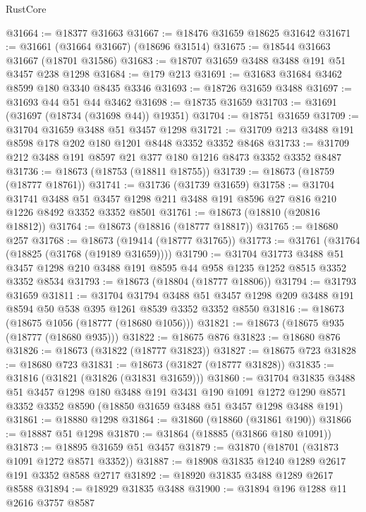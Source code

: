 \begin{lexlean}{RustCore}
\begin{coremodule}
@31664 := @18377 @31663
@31667 := @18476 @31659 @18625 @31642
@31671 := @31661 (@31664 @31667) (@18696 @31514)
@31675 := @18544 @31663 @31667 (@18701 @31586)
@31683 := @18707 @31659 @3488 @3488 @191 @51 @3457 @238 @1298
@31684 := @179 @213
@31691 := @31683 @31684 @3462 @8599 @180 @3340 @8435 @3346
@31693 := @18726 @31659 @3488
@31697 := @31693 @44 @51 @44 @3462
@31698 := @18735 @31659
@31703 := @31691 (@31697 (@18734 (@31698 @44)) @19351)
@31704 := @18751 @31659
@31709 := @31704 @31659 @3488 @51 @3457 @1298
@31721 := @31709 @213 @3488 @191 @8598 @178 @202 @180 @1201 @8448 @3352 @3352 @8468
@31733 := @31709 @212 @3488 @191 @8597 @21 @377 @180 @1216 @8473 @3352 @3352 @8487
@31736 := @18673 (@18753 (@18811 @18755))
@31739 := @18673 (@18759 (@18777 @18761))
@31741 := @31736 (@31739 @31659)
@31758 := @31704
    @31741
    @3488
    @51
    @3457
    @1298
    @211
    @3488
    @191
    @8596
    @27
    @816
    @210
    @1226
    @8492
    @3352
    @3352
    @8501
@31761 := @18673 (@18810 (@20816 @18812))
@31764 := @18673 (@18816 (@18777 @18817))
@31765 := @18680 @257
@31768 := @18673 (@19414 (@18777 @31765))
@31773 := @31761 (@31764 (@18825 (@31768 (@19189 @31659))))
@31790 := @31704
    @31773
    @3488
    @51
    @3457
    @1298
    @210
    @3488
    @191
    @8595
    @44
    @958
    @1235
    @1252
    @8515
    @3352
    @3352
    @8534
@31793 := @18673 (@18804 (@18777 @18806))
@31794 := @31793 @31659
@31811 := @31704
    @31794
    @3488
    @51
    @3457
    @1298
    @209
    @3488
    @191
    @8594
    @50
    @538
    @395
    @1261
    @8539
    @3352
    @3352
    @8550
@31816 := @18673 (@18675 @1056 (@18777 (@18680 @1056)))
@31821 := @18673 (@18675 @935 (@18777 (@18680 @935)))
@31822 := @18675 @876
@31823 := @18680 @876
@31826 := @18673 (@31822 (@18777 @31823))
@31827 := @18675 @723
@31828 := @18680 @723
@31831 := @18673 (@31827 (@18777 @31828))
@31835 := @31816 (@31821 (@31826 (@31831 @31659)))
@31860 := @31704
    @31835
    @3488
    @51
    @3457
    @1298
    @180
    @3488
    @191
    @3431
    @190
    @1091
    @1272
    @1290
    @8571
    @3352
    @3352
    @8590
    (@18850 @31659 @3488 @51 @3457 @1298 @3488 @191)
@31861 := @18880 @1298
@31864 := @31860 (@18860 (@31861 @190))
@31866 := @18887 @51 @1298
@31870 := @31864 (@18885 (@31866 @180 @1091))
@31873 := @18895 @31659 @51 @3457
@31879 := @31870 (@18701 (@31873 @1091 @1272 @8571 @3352))
@31887 := @18908 @31835 @1240 @1289 @2617 @191 @3352 @8588 @2717
@31892 := @18920 @31835 @3488 @1289 @2617 @8588
@31894 := @18929 @31835 @3488
@31900 := @31894 @196 @1288 @11 @2616 @3757 @8587

\end{coremodule}
\end{lexlean}
